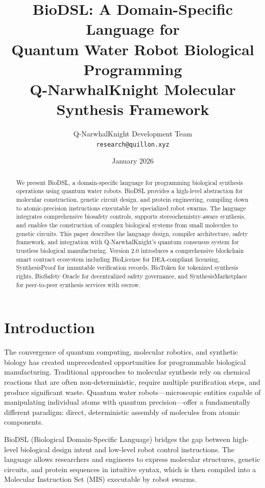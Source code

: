 \documentclass[12pt,a4paper]{article}
\title{\textbf{BioDSL: A Domain-Specific Language for\\Quantum Water Robot Biological Programming}\\[0.5em]
\large{Q-NarwhalKnight Molecular Synthesis Framework}}
\author{
Q-NarwhalKnight Development Team\\
\texttt{research@quillon.xyz}
}
\date{January 2026}
\begin{document}
\maketitle

\begin{abstract}
We present BioDSL, a domain-specific language for programming biological synthesis operations using quantum water robots. BioDSL provides a high-level abstraction for molecular construction, genetic circuit design, and protein engineering, compiling down to atomic-precision instructions executable by specialized robot swarms. The language integrates comprehensive biosafety controls, supports stereochemistry-aware synthesis, and enables the construction of complex biological systems from small molecules to genetic circuits. This paper describes the language design, compiler architecture, safety framework, and integration with Q-NarwhalKnight's quantum consensus system for trustless biological manufacturing. Version 2.0 introduces a comprehensive blockchain smart contract ecosystem including BioLicense for DEA-compliant licensing, SynthesisProof for immutable verification records, BioToken for tokenized synthesis rights, BioSafety Oracle for decentralized safety governance, and SynthesisMarketplace for peer-to-peer synthesis services with escrow.
\end{abstract}

\section{Introduction}

The convergence of quantum computing, molecular robotics, and synthetic biology has created unprecedented opportunities for programmable biological manufacturing. Traditional approaches to molecular synthesis rely on chemical reactions that are often non-deterministic, require multiple purification steps, and produce significant waste. Quantum water robots---microscopic entities capable of manipulating individual atoms with quantum precision---offer a fundamentally different paradigm: direct, deterministic assembly of molecules from atomic components.

BioDSL (Biological Domain-Specific Language) bridges the gap between high-level biological design intent and low-level robot control instructions. The language allows researchers and engineers to express molecular structures, genetic circuits, and protein sequences in intuitive syntax, which is then compiled into a Molecular Instruction Set (MIS) executable by robot swarms.
\end{document}
